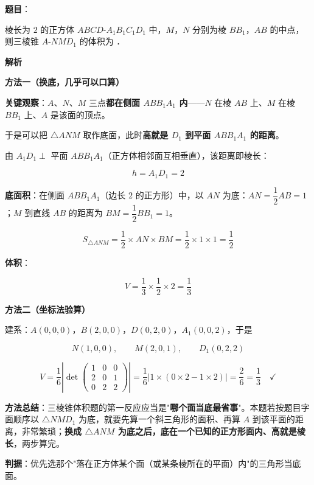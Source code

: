 \begin{answer}

\textbf{题目}：

棱长为 $2$ 的正方体 $ABCD\text{-}A_1B_1C_1D_1$ 中，$M$，$N$ 分别为棱 $BB_1$，$AB$ 的中点，则三棱锥 $A\text{-}NMD_1$ 的体积为 \gkblank{}．

\textbf{解析}

\textbf{方法一（换底，几乎可以口算）}

\textbf{关键观察}：$A$、$N$、$M$ 三点\textbf{都在侧面 $ABB_1A_1$ 内}——$N$ 在棱 $AB$ 上、$M$ 在棱 $BB_1$ 上、$A$ 是该面的顶点。

于是可以把 $\triangle ANM$ 取作底面，此时\textbf{高就是 $D_1$ 到平面 $ABB_1A_1$ 的距离}。

由 $A_1D_1\perp$ 平面 $ABB_1A_1$（正方体相邻面互相垂直），该距离即棱长：

\nopagebreak[4]
\[h=A_1D_1=2\]

\textbf{底面积}：在侧面 $ABB_1A_1$（边长 $2$ 的正方形）中，以 $AN$ 为底：$AN=\dfrac12AB=1$；$M$ 到直线 $AB$ 的距离为 $BM=\dfrac12BB_1=1$。

\nopagebreak[4]
\[S_{\triangle ANM}=\frac12\times AN\times BM=\frac12\times1\times1=\frac12\]

\textbf{体积}：

\nopagebreak[4]
\[V=\frac13\times\frac12\times2=\frac13\]

\textbf{方法二（坐标法验算）}

建系：$A(0,0,0)$，$B(2,0,0)$，$D(0,2,0)$，$A_1(0,0,2)$，于是

\nopagebreak[4]
\[N(1,0,0),\qquad M(2,0,1),\qquad D_1(0,2,2)\]

\nopagebreak[4]
\[V=\frac16\left|\det\begin{pmatrix}1&0&0\\2&0&1\\0&2&2\end{pmatrix}\right|=\frac16\left|1\times(0\times2-1\times2)\right|=\frac26=\frac13\quad\checkmark\]

\begin{gktip}
\textbf{方法总结}：三棱锥体积题的第一反应应当是"\textbf{哪个面当底最省事}"。本题若按题目字面顺序以 $\triangle NMD_1$ 为底，就要先算一个斜三角形的面积、再算 $A$ 到该平面的距离，非常繁琐；\textbf{换成 $\triangle ANM$ 为底之后，底在一个已知的正方形面内、高就是棱长}，两步算完。

\textbf{判据}：优先选那个"落在正方体某个面（或某条棱所在的平面）内"的三角形当底面。
\end{gktip}


\par\medskip

\end{answer}
